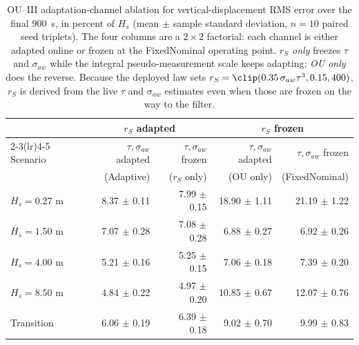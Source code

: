 \begin{table}[t]
  \centering
  \caption{OU--III adaptation-channel ablation for vertical-displacement RMS error over the final \SI{900}{s}, in percent of $H_s$ (mean $\pm$ sample standard deviation, $n=10$ paired seed triplets). The four columns are a $2\times2$ factorial: each channel is either adapted online or frozen at the FixedNominal operating point. \emph{$r_S$ only} freezes $\tau$ and $\sigma_{aw}$ while the integral pseudo-measurement scale keeps adapting; \emph{OU only} does the reverse. Because the deployed law sets $r_S=\clip(0.35\,\sigma_{aw}\tau^{3},0.15,400)$, $r_S$ is derived from the live $\tau$ and $\sigma_{aw}$ estimates even when those are frozen on the way to the filter.}
  \label{tab:ou_mc_channels}
  \footnotesize
  \setlength{\tabcolsep}{4.0pt}
  \begin{tabular}{@{}lrrrr@{}}
    \toprule
    & \multicolumn{2}{c}{$r_S$ adapted} & \multicolumn{2}{c}{$r_S$ frozen} \\
    \cmidrule(lr){2-3}\cmidrule(lr){4-5}
    Scenario & $\tau,\sigma_{aw}$ adapted & $\tau,\sigma_{aw}$ frozen & $\tau,\sigma_{aw}$ adapted & $\tau,\sigma_{aw}$ frozen \\
    & (Adaptive) & ($r_S$ only) & (OU only) & (FixedNominal) \\
    \midrule
    $H_s=0.27$ m & 8.37 $\pm$ 0.11 & 7.99 $\pm$ 0.15 & 18.90 $\pm$ 1.11 & 21.19 $\pm$ 1.22 \\
    $H_s=1.50$ m & 7.07 $\pm$ 0.28 & 7.08 $\pm$ 0.28 & 6.88 $\pm$ 0.27 & 6.92 $\pm$ 0.26 \\
    $H_s=4.00$ m & 5.21 $\pm$ 0.16 & 5.25 $\pm$ 0.15 & 7.06 $\pm$ 0.18 & 7.39 $\pm$ 0.20 \\
    $H_s=8.50$ m & 4.84 $\pm$ 0.22 & 4.97 $\pm$ 0.20 & 10.85 $\pm$ 0.67 & 12.07 $\pm$ 0.76 \\
    Transition & 6.06 $\pm$ 0.19 & 6.39 $\pm$ 0.18 & 9.02 $\pm$ 0.70 & 9.99 $\pm$ 0.83 \\
    \bottomrule
  \end{tabular}
\end{table}


